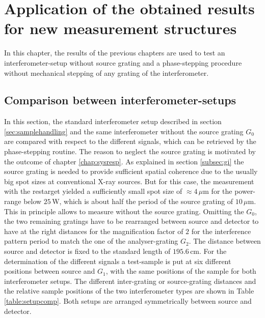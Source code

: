 \chapter{Application of the obtained results for new measurement structures}\label{chap:applic}
In this chapter, the results of the previous chapters are used to test an interferometer-setup without source grating and a phase-stepping procedure without mechanical stepping of any grating of the interferometer.  
\section[Different interferometer setups]{Comparison between interferometer-setups}\label{sec:interferosetups}
In this section, the standard interferometer setup described in section \ref{sec:samplehandling} and the same interferometer without the source grating $G_{0}$ are compared with respect to the different signals, which can be retrieved by the phase-stepping routine. The reason to neglect the source grating is motivated by the outcome of chapter \ref{chap:sysresp}. As explained in section \ref{subsec:gi} the source grating is needed to provide sufficient spatial coherence due to the usually big spot sizes at conventional X-ray sources. But for this case, the measurement with the \gls{restarget} yielded a sufficiently small spot size of $\approx 4\, \mu$m for the power-range below $25\,$W, which is about half the period of the source grating of $10\, \mu$m. This in principle allows to measure without the source grating. Omitting the $G_{0}$, the two remaining gratings have to be rearranged between source and detector to have at the right distances for the magnification factor of $2$ for the interference pattern period to match the one of the analyser-grating $G_{2}$. The distance between source and detector is fixed to the standard length of $195.6\,$cm. For the determination of the different signals a test-sample is put at six different positions between source and $G_{1}$, with the same positions of the sample for both interferometer setups. The different inter-grating or source-grating distances and the relative sample positions of the two interferometer types are shown in Table \ref{table:setupcomp}. Both setups are arranged symmetrically between source and detector.
